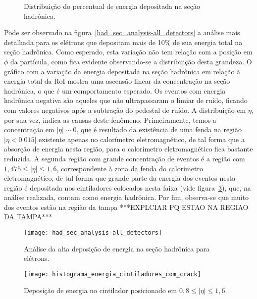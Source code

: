 \begin{figure}
\centering 
{}
\caption{Distribuição do percentual de energia depositada na seção hadrônica.} 
\label{fig:energia_secao_hadronica} 
\end{figure} 

Pode ser observado na figura~\ref{had_sec_analysis-all_detectors} a análise mais detalhada para os elétrons que depositam mais de 10\% de sua energia total na seção hadrônica. Como esperado, esta variação não tem relação com a posição em $\phi$ da partícula, como fica evidente observando-se a distribuição desta grandeza. O gráfico com a variação da energia depositada na seção hadrônica em relação à energia total da RoI mostra uma ascensão linear da concentração na seção hadrônica, o que é um comportamento esperado. Os eventos com energia hadrônica negativa são aqueles que não ultrapassaram o limiar de ruído, ficando com valores negativos após a subtração do pedestal de ruído. A distribuição em $\eta$, por sua vez, indica as causas  deste fenômeno. Primeiramente, temos a concentração em $| \eta | \sim 0$, que é resultado da existência de uma fenda na região $| \eta < 0.015 |$ existente apenas no calorímetro eletromagnético, de tal forma que a absorção de energia nesta região, para o calorímetro eletromagnético fica bastante reduzida. A segunda região com grande concentração de eventos é a região  com $1,475 \leq | \eta | \leq 1,6$, correspondente à zona da fenda do calorímetro eletromagnético, de tal forma que grande parte da energia dos eventos nesta região é depositada nos cintiladores colocados nesta faixa (vide figura~\ref{fig:deposicao_energia_cintiladores}), que, na análise realizada, contam como energia hadrônica. Por fim, observa-se que muito dos eventos estão na região da tampa ***EXPLCIAR PQ ESTAO NA REGIAO DA TAMPA***

\begin{figure}
\centering 
\texttt{[image: had\_sec\_analysis-all\_detectors]}
\caption{Análise da alta deposição de energia na seção hadrônica para elétrons.} 
\label{fig:analise_secao_hadronica_eletrons} 
\end{figure} 


\begin{figure}
\centering 
\texttt{[image: histograma\_energia\_cintiladores\_com\_crack]}
\caption{Deposição de energia no cintilador posicionado em $0,8 \leq | \eta | \leq 1,6$.} 
\label{fig:deposicao_energia_cintiladores} 
\end{figure} 

